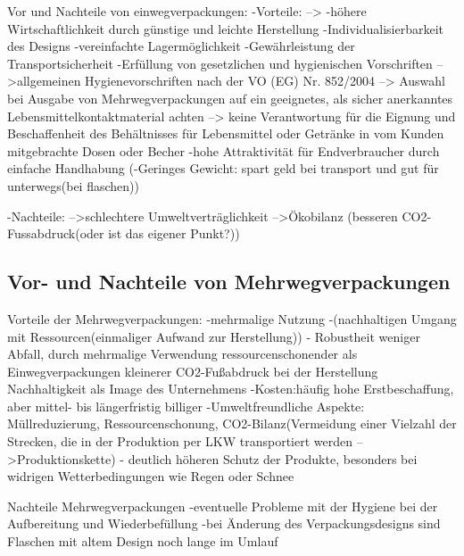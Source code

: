 Vor und Nachteile von einwegverpackungen:
-Vorteile:
--> -höhere Wirtschaftlichkeit durch günstige und leichte Herstellung
    -Individualisierbarkeit des Designs
    -vereinfachte Lagermöglichkeit
    -Gewährleistung der Transportsicherheit
    -Erfüllung von gesetzlichen und hygienischen Vorschriften
        -->allgemeinen Hygienevorschriften nach der VO (EG) Nr. 852/2004
        --> Auswahl bei Ausgabe von Mehrwegverpackungen auf ein geeignetes, als sicher anerkanntes Lebensmittelkontaktmaterial achten
            --> keine Verantwortung für die Eignung und Beschaffenheit des Behältnisses für Lebensmittel oder Getränke in vom Kunden mitgebrachte Dosen oder Becher
    -hohe Attraktivität für Endverbraucher durch einfache Handhabung
    (-Geringes Gewicht: spart geld bei transport und gut für unterwegs(bei flaschen))

-Nachteile:
-->schlechtere Umweltverträglichkeit
-->Ökobilanz (besseren CO2-Fussabdruck(oder ist das eigener Punkt?))


\subsection{Vor- und Nachteile von Mehrwegverpackungen}
\label{sec:Vor- und Nachteile von Mehrwegverpackungen}


Vorteile der Mehrwegverpackungen:
-mehrmalige Nutzung
-(nachhaltigen Umgang mit Ressourcen(einmaliger Aufwand zur Herstellung))
-    Robustheit
    weniger Abfall, durch mehrmalige Verwendung
    ressourcenschonender als Einwegverpackungen  
    kleinerer CO2-Fußabdruck bei der Herstellung
    Nachhaltigkeit als Image des Unternehmens
-Kosten:häufig hohe Erstbeschaffung, aber mittel- bis längerfristig billiger
-Umweltfreundliche Aspekte: Müllreduzierung, Ressourcenschonung, CO2-Bilanz(Vermeidung einer Vielzahl der Strecken, die in der Produktion per LKW transportiert werden -->Produktionskette)
- deutlich höheren Schutz der Produkte, besonders bei widrigen Wetterbedingungen wie Regen oder Schnee%


Nachteile Mehrwegverpackungen %
-eventuelle Probleme mit der Hygiene bei der Aufbereitung und Wiederbefüllung 
-bei Änderung des Verpackungsdesigns sind Flaschen mit altem Design noch lange im Umlauf



